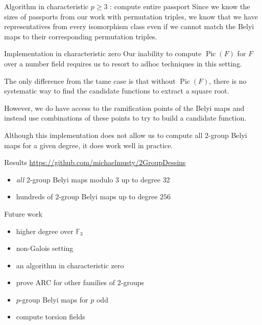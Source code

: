 \documentclass[handout,xcolor=dvipsnames]{beamer}
\theoremstyle{plain}
\newcommand{\FF}{\mathbb{F}}
\DeclareMathOperator{\Pic}{Pic}
\begin{document}
{\begin{frame}{Algorithm in characteristic $p\geq 3$ : compute entire passport}
      Since we know the sizes of passports from our
      work with permutation triples,
      we know that we have representatives from
      every isomorphism class
      even if we cannot match the Belyi maps
      to their corresponding permutation triples.
    \end{frame}
    \begin{frame}{Implementation in characteristic zero}
      Our inability to compute $\Pic(F)$
      for $F$ over a number field requires
      us to resort to adhoc techniques in this setting.
      \pause\par
      The only difference from the tame case is that
      without $\Pic(F)$, there is no systematic way
      to find the candidate functions to extract
      a square root.
      \pause\par
      However, we do have access to the ramification points
      of the Belyi maps and instead use combinations
      of these points to try to build a candidate function.
      \pause\par
      Although this implementation does not allow us
      to compute all $2$-group Belyi maps for a given
      degree, it does work well in practice.
    \end{frame}
    \begin{frame}{Results}
        \url{https://github.com/michaelmusty/2GroupDessins}
      \begin{itemize}
        \item
          \emph{all} $2$-group Belyi maps modulo $3$ up to degree $32$
        \item
          hundreds of $2$-group Belyi maps up to degree $256$
      \end{itemize}
    \end{frame}
  }
  \begin{frame}{Future work}
    \begin{itemize}
      \item
        higher degree over $\FF_3$
      \item
        non-Galois setting
      \item
        an algorithm in characteristic zero
      \item
        prove ARC for other families of $2$-groups
      \item
        $p$-group Belyi maps for $p$ odd
      \item
        compute torsion fields
    \end{itemize}
  \end{frame}
\end{document}
